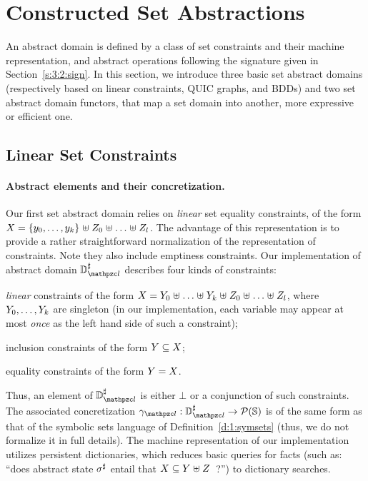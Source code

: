 \section{Constructed Set Abstractions}
\label{sec:constructed}
An abstract domain is defined by a class of set constraints and their machine
representation, and abstract operations following the signature given in
Section~\ref{s:3:2:sign}.
In this section, we introduce three basic set abstract domains (respectively
based on linear constraints, QUIC graphs, and BDDs) and two set abstract
domain functors, that map a set domain into another, more expressive or
efficient one.

\subsection{Linear Set Constraints}
\label{s:4:1:lin}
\newcommand{\adomlin}{\adom_{\zcl}}
\newcommand{\gammalin}{\gamma_{\zcl}}
\paragraph{Abstract elements and their concretization.}
Our first set abstract domain relies on {\em linear} set equality
constraints, of the form \( X = \{ y_0, \ldots, y_k \} \mathrel{\uplus}
Z_0 \mathrel{\uplus} \ldots \mathrel{\uplus} Z_l \).
The advantage of this representation is to provide a rather straightforward
normalization of the representation of constraints.
Note they also include emptiness constraints.
Our implementation of abstract domain \( \adomlin \) describes four kinds
of constraints:
\begin{compactitem}
\item {\em linear} constraints of the form \( X = Y_0 \mathrel{\uplus}
  \ldots \mathrel{\uplus} Y_k \mathrel{\uplus} Z_0 \mathrel{\uplus} \ldots \mathrel{\uplus}
  Z_l \), where \( Y_0, \ldots, Y_k \) are singleton
  (in our implementation, each variable may appear at most {\em once}
  as the left hand side of such a constraint);
\item inclusion constraints of the form \( Y \subseteq X \);
\item equality constraints of the form \( Y = X \).
\end{compactitem}
Thus, an element of \( \adomlin \) is either \( \bot \) or a conjunction of
such constraints.
The associated concretization \( \gammalin: \adomlin \rightarrow
\partsof{\states} \) is of the same form as that of the symbolic sets
language of Definition~\ref{d:1:symsets} (thus, we do not formalize it
in full details).
The machine representation of our implementation utilizes persistent
dictionaries, which reduces basic queries for facts (such as: ``does
abstract state \( {\sigma}^{\sharp} \) entail that \( X \subseteq Y
\mathrel{\uplus} Z \)~?'') to dictionary searches.

